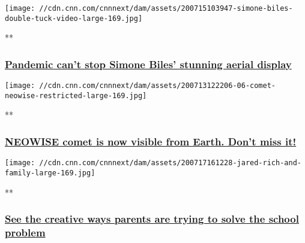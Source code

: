 \href{/videos/sports/2020/07/15/simone-biles-double-tuck-video-orig-vstan-bdk.cnn/video/playlists/trending-video/}{}

\texttt{[image: //cdn.cnn.com/cnnnext/dam/assets/200715103947-simone-biles-double-tuck-video-large-169.jpg]}

**

\hypertarget{pandemic-cant-stop-simone-biles-stunning-aerial-display}{%
\subsubsection{\texorpdfstring{\href{/videos/sports/2020/07/15/simone-biles-double-tuck-video-orig-vstan-bdk.cnn/video/playlists/trending-video/}{Pandemic
can't stop Simone Biles' stunning aerial
display}}{Pandemic can't stop Simone Biles' stunning aerial display}}\label{pandemic-cant-stop-simone-biles-stunning-aerial-display}}

\href{/videos/world/2020/07/13/comet-neowise-2020-orig-jk.cnn/video/playlists/trending-video/}{}

\texttt{[image: //cdn.cnn.com/cnnnext/dam/assets/200713122206-06-comet-neowise-restricted-large-169.jpg]}

**

\hypertarget{neowise-comet-is-now-visible-from-earth-dont-miss-it}{%
\subsubsection{\texorpdfstring{\href{/videos/world/2020/07/13/comet-neowise-2020-orig-jk.cnn/video/playlists/trending-video/}{NEOWISE
comet is now visible from Earth. Don't miss
it!}}{NEOWISE comet is now visible from Earth. Don't miss it!}}\label{neowise-comet-is-now-visible-from-earth-dont-miss-it}}

\href{/videos/us/2020/07/17/back-to-school-alternatives-covid-19-orig-mss-kj.cnn/video/playlists/trending-video/}{}

\texttt{[image: //cdn.cnn.com/cnnnext/dam/assets/200717161228-jared-rich-and-family-large-169.jpg]}

**

\hypertarget{see-the-creative-ways-parents-are-trying-to-solve-the-school-problem}{%
\subsubsection{\texorpdfstring{\href{/videos/us/2020/07/17/back-to-school-alternatives-covid-19-orig-mss-kj.cnn/video/playlists/trending-video/}{See
the creative ways parents are trying to solve the school
problem}}{See the creative ways parents are trying to solve the school problem}}\label{see-the-creative-ways-parents-are-trying-to-solve-the-school-problem}}

